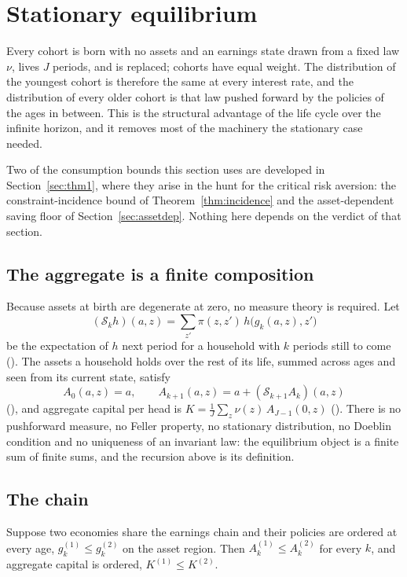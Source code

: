 \section{Stationary equilibrium}\label{sec:eqm}

Every cohort is born with no assets and an earnings state drawn from a fixed law $\nu$, lives $J$
periods, and is replaced; cohorts have equal weight. The distribution of the youngest cohort is
therefore the same at every interest rate, and the distribution of every older cohort is that law
pushed forward by the policies of the ages in between. This is the structural advantage of the
life cycle over the infinite horizon, and it removes most of the machinery the stationary case
needed.

Two of the consumption bounds this section uses are developed in Section~\ref{sec:thm1}, where
they arise in the hunt for the critical risk aversion: the constraint-incidence bound of
Theorem~\ref{thm:incidence} and the asset-dependent saving floor of Section~\ref{sec:assetdep}.
Nothing here depends on the verdict of that section.

\subsection{The aggregate is a finite composition}

Because assets at birth are degenerate at zero, no measure theory is required. Let
\[
  (\mathcal{S}_k h)(a,z)=\sum_{z'}\pi(z,z')\,h\bigl(g_k(a,z),z'\bigr)
\]
be the expectation of $h$ next period for a household with $k$ periods still to come
(). The assets a household holds over the rest of its life, summed across ages
and seen from its current state, satisfy
\[
  A_0(a,z)=a,\qquad A_{k+1}(a,z)=a+(\mathcal{S}_{k+1}A_k)(a,z)
\]
(), and aggregate capital per head is
$K=\frac1J\sum_z\nu(z)\,A_{J-1}(0,z)$ (). There is no pushforward measure, no
Feller property, no stationary distribution, no Doeblin condition and no uniqueness of an
invariant law: the equilibrium object is a finite sum of finite sums, and the recursion above is
its definition.

\subsection{The chain}

\begin{theorem}\label{thm:thm2}
Suppose two economies share the earnings chain and their policies are ordered at every age,
$g^{(1)}_k\le g^{(2)}_k$ on the asset region. Then $A^{(1)}_k\le A^{(2)}_k$ for every $k$, and
aggregate capital is ordered, $K^{(1)}\le K^{(2)}$.
\end{theorem}

